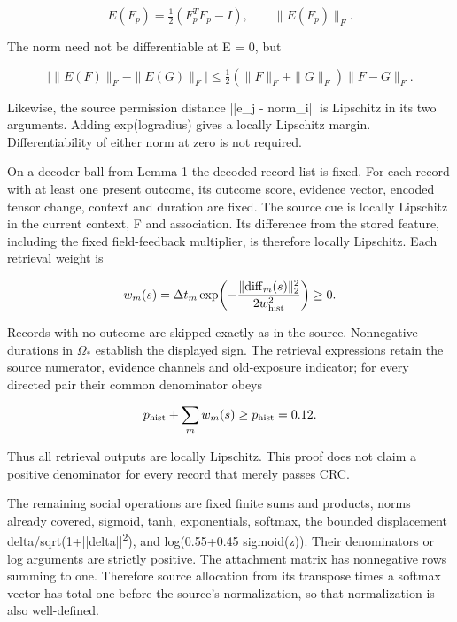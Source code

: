 \documentclass[11pt,a4paper]{article}
\begin{document}
\[
E(F_p)=\tfrac12(F_p^TF_p-I),\qquad\|E(F_p)\|_F.
\]



The norm need not be differentiable at E = 0, but



\[
\bigl|\|E(F)\|_F-\|E(G)\|_F\bigr|
\le\tfrac12(\|F\|_F+\|G\|_F)\|F-G\|_F.
\]



Likewise, the source permission distance ||e\_j - norm\_i|| is Lipschitz in its two arguments. Adding exp(logradius) gives a locally Lipschitz margin. Differentiability of either norm at zero is not required.

On a decoder ball from Lemma 1 the decoded record list is fixed. For each record with at least one present outcome, its outcome score, evidence vector, encoded tensor change, context and duration are fixed. The source cue is locally Lipschitz in the current context, F and association. Its difference from the stored feature, including the fixed field-feedback multiplier, is therefore locally Lipschitz. Each retrieval weight is



\[
w_m(s)=\Delta t_m\exp\!\left(-\frac{\|\mathrm{diff}_m(s)\|_2^2}{2w_{\rm hist}^2}\right)\ge0.
\]



Records with no outcome are skipped exactly as in the source. Nonnegative durations in \(\Omega_*\) establish the displayed sign. The retrieval expressions retain the source numerator, evidence channels and old-exposure indicator; for every directed pair their common denominator obeys



\[
p_{\rm hist}+\sum_m w_m(s)\ge p_{\rm hist}=0.12.
\]



Thus all retrieval outputs are locally Lipschitz. This proof does not claim a positive denominator for every record that merely passes CRC.

The remaining social operations are fixed finite sums and products, norms already covered, sigmoid, tanh, exponentials, softmax, the bounded displacement delta/sqrt(1+||delta||\textsuperscript{2}), and log(0.55+0.45 sigmoid(z)). Their denominators or log arguments are strictly positive. The attachment matrix has nonnegative rows summing to one. Therefore source allocation from its transpose times a softmax vector has total one before the source's normalization, so that normalization is also well-defined.
\end{document}
